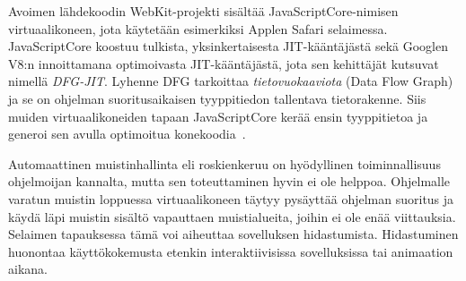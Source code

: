 Avoimen lähdekoodin WebKit-projekti sisältää JavaScriptCore-nimisen virtuaalikoneen, jota käytetään esimerkiksi Applen Safari selaimessa. Java\-Script\-Core koostuu tulkista, yksinkertaisesta JIT-kääntäjästä sekä Googlen V8:n innoittamana optimoivasta JIT-kääntäjästä, jota sen kehittäjät kutsuvat nimellä \textit{DFG-JIT}. Lyhenne DFG tarkoittaa \textit{tietovuokaaviota} (Data Flow Graph) ja se on ohjelman suoritusaikaisen tyyppitiedon tallentava tietorakenne. Siis muiden virtuaalikoneiden tapaan JavaScriptCore kerää ensin tyyppitietoa ja generoi sen avulla optimoitua konekoodia~\cite{javascriptcore}.

Automaattinen muistinhallinta eli roskienkeruu on hyödyllinen toiminnallisuus ohjelmoijan kannalta, mutta sen toteuttaminen hyvin ei ole helppoa. Ohjelmalle varatun muistin loppuessa virtuaalikoneen täytyy pysäyttää ohjelman suoritus ja käydä läpi muistin sisältö vapauttaen muistialueita, joihin ei ole enää viittauksia. Selaimen tapauksessa tämä voi aiheuttaa sovelluksen hidastumista. Hidastuminen huonontaa käyttökokemusta etenkin interaktiivisissa sovelluksissa tai animaation aikana.
